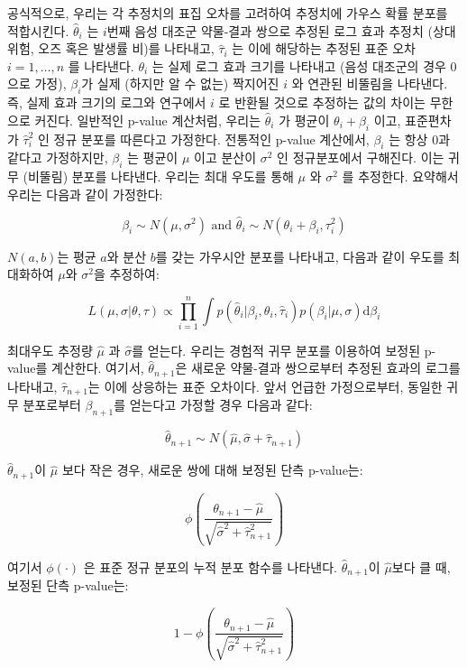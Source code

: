 \documentclass[10.5pt]{book}
\theoremstyle{definition}
\theoremstyle{definition}
\theoremstyle{definition}
\theoremstyle{remark}
\begin{document}
공식적으로, 우리는 각 추정치의 표집 오차를 고려하여 추정치에 가우스 확률
분포를 적합시킨다. \(\hat{\theta}_i\) 는 \(i\)번째 음성 대조군 약물-결과
쌍으로 추정된 로그 효과 추정치 (상대 위험, 오즈 혹은 발생률 비)를
나타내고, \(\hat{\tau}_i\) 는 이에 해당하는 추정된 표준 오차
\(i=1,\ldots,n\) 를 나타낸다. \(\theta_i\) 는 실제 로그 효과 크기를
나타내고 (음성 대조군의 경우 0으로 가정), \(\beta_i\)가 실제 (하지만 알
수 없는) 짝지어진 \(i\) 와 연관된 비뚤림을 나타낸다. 즉, 실제 효과
크기의 로그와 연구에서 \(i\) 로 반환될 것으로 추정하는 값의 차이는
무한으로 커진다. 일반적인 p-value 계산처럼, 우리는 \(\hat{\theta}_i\) 가
평균이 \(\theta_i + \beta_i\) 이고, 표준편차가 \(\hat{\tau}_i^2\) 인
정규 분포를 따른다고 가정한다. 전통적인 p-value 계산에서, \(\beta_i\) 는
항상 0과 같다고 가정하지만, \(\beta_i\) 는 평균이 \(\mu\) 이고 분산이
\(\sigma^2\) 인 정규분포에서 구해진다. 이는 귀무 (비뚤림) 분포를
나타낸다. 우리는 최대 우도를 통해 \(\mu\) 와 \(\sigma^2\) 를 추정한다.
요약해서 우리는 다음과 같이 가정한다:

\[\beta_i \sim N(\mu,\sigma^2) \text{  and  } \hat{\theta}_i \sim N(\theta_i + \beta_i, \tau_i^2)\]

\(N(a,b)\)는 평균 \(a\)와 분산 \(b\)를 갖는 가우시안 분포를 나타내고,
다음과 같이 우도를 최대화하여 \(\mu\)와 \(\sigma^2\)을 추정하여:

\[L(\mu, \sigma | \theta, \tau) \propto \prod_{i=1}^{n}\int p(\hat{\theta}_i|\beta_i, \theta_i, \hat{\tau}_i)p(\beta_i|\mu, \sigma) \text{d}\beta_i\]

최대우도 추정량 \(\hat{\mu}\) 과 \(\hat{\sigma}\)를 얻는다. 우리는
경험적 귀무 분포를 이용하여 보정된 p-value를 계산한다. 여기서,
\(\hat{\theta}_{n+1}\)은 새로운 약물-결과 쌍으로부터 추정된 효과의
로그를 나타내고, \(\hat{\tau}_{n+1}\)는 이에 상응하는 표준 오차이다.
앞서 언급한 가정으로부터, 동일한 귀무 분포로부터 \(\beta_{n+1}\)를
얻는다고 가정할 경우 다음과 같다:

\[\hat{\theta}_{n+1} \sim N(\hat{\mu}, \hat{\sigma} + \hat{\tau}_{n+1})\]

\(\hat{\theta}_{n+1}\)이 \(\hat{\mu}\) 보다 작은 경우, 새로운 쌍에 대해
보정된 단측 p-value는:

\[\phi\left(\frac{\theta_{n+1} - \hat{\mu}}{\sqrt{\hat{\sigma}^2 + \hat{\tau}_{n+1}^2}}\right)\]

여기서 \(\phi(\cdot)\) 은 표준 정규 분포의 누적 분포 함수를 나타낸다.
\(\hat{\theta}_{n+1}\)이 \(\hat{\mu}\)보다 클 때, 보정된 단측 p-value는:

\[1-\phi\left(\frac{\theta_{n+1} - \hat{\mu}}{\sqrt{\hat{\sigma}^2 + \hat{\tau}_{n+1}^2}}\right)\]
\end{document}
